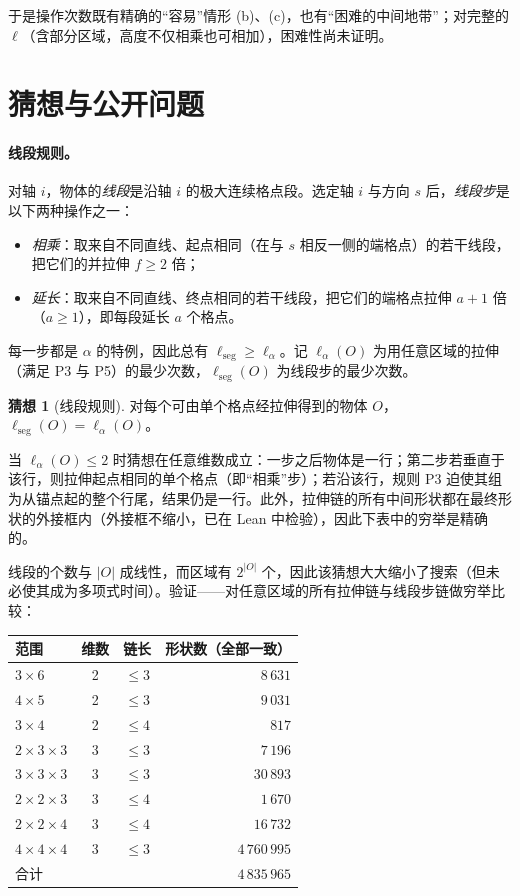\documentclass[11pt,a4paper]{article}
\theoremstyle{plain}
\theoremstyle{definition}
\newtheorem{conjecture}{猜想}
\theoremstyle{remark}
\begin{document}
于是操作次数既有精确的“容易”情形 (b)、(c)，也有“困难的中间地带”；对完整的 $\ell$（含部分区域，高度不仅相乘也可相加），困难性尚未证明。

\section{猜想与公开问题}\label{sec:conj}

\paragraph{线段规则。} 对轴 $i$，物体的\emph{线段}是沿轴 $i$ 的极大连续格点段。选定轴 $i$ 与方向 $s$ 后，\emph{线段步}是以下两种操作之一：
\begin{itemize}
\item \emph{相乘}：取来自不同直线、起点相同（在与 $s$ 相反一侧的端格点）的若干线段，把它们的并拉伸 $f\ge2$ 倍；
\item \emph{延长}：取来自不同直线、终点相同的若干线段，把它们的端格点拉伸 $a+1$ 倍（$a\ge1$），即每段延长 $a$ 个格点。
\end{itemize}
每一步都是 $\alpha$ 的特例，因此总有 $\ell_{\mathrm{seg}}\ge\ell_\alpha$。记 $\ell_{\alpha}(O)$ 为用任意区域的拉伸（满足 P3 与 P5）的最少次数，$\ell_{\mathrm{seg}}(O)$ 为线段步的最少次数。

\begin{conjecture}[线段规则]\label{conj:seg}
对每个可由单个格点经拉伸得到的物体 $O$，$\ell_{\mathrm{seg}}(O)=\ell_\alpha(O)$。
\end{conjecture}

当 $\ell_\alpha(O)\le2$ 时猜想在任意维数成立：一步之后物体是一行；第二步若垂直于该行，则拉伸起点相同的单个格点（即“相乘”步）；若沿该行，规则 P3 迫使其组为从锚点起的整个行尾，结果仍是一行。此外，拉伸链的所有中间形状都在最终形状的外接框内（外接框不缩小，已在 Lean 中检验），因此下表中的穷举是精确的。

线段的个数与 $|O|$ 成线性，而区域有 $2^{|O|}$ 个，因此该猜想大大缩小了搜索（但未必使其成为多项式时间）。验证——对任意区域的所有拉伸链与线段步链做穷举比较：

\begin{center}
\begin{tabular}{lccr}
\toprule
范围 & 维数 & 链长 & 形状数（全部一致）\\
\midrule
$3\times6$ & 2 & $\le3$ & $8\,631$\\
$4\times5$ & 2 & $\le3$ & $9\,031$\\
$3\times4$ & 2 & $\le4$ & $817$\\
$2\times3\times3$ & 3 & $\le3$ & $7\,196$\\
$3\times3\times3$ & 3 & $\le3$ & $30\,893$\\
$2\times2\times3$ & 3 & $\le4$ & $1\,670$\\
$2\times2\times4$ & 3 & $\le4$ & $16\,732$\\
$4\times4\times4$ & 3 & $\le3$ & $4\,760\,995$\\
\midrule
合计 & & & $4\,835\,965$\\
\bottomrule
\end{tabular}
\end{center}
\end{document}
